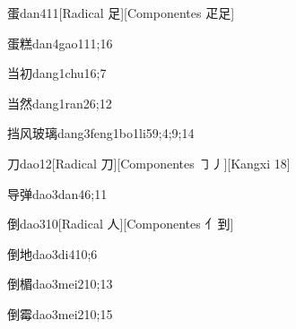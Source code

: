 \begin{verbete}{蛋}{dan4}{11}[Radical 足][Componentes ⽦足]
\end{verbete}

\begin{verbete}{蛋糕}{dan4gao1}{11;16}
\end{verbete}

\begin{verbete}{当初}{dang1chu1}{6;7}
\end{verbete}

\begin{verbete}{当然}{dang1ran2}{6;12}
\end{verbete}

\begin{verbete}{挡风玻璃}{dang3feng1bo1li5}{9;4;9;14}
\end{verbete}

\begin{verbete}{刀}{dao1}{2}[Radical ⼑][Componentes ㇆丿][Kangxi 18]
\end{verbete}

\begin{verbete}{导弹}{dao3dan4}{6;11}
\end{verbete}

\begin{verbete}{倒}{dao3}{10}[Radical 人][Componentes ⺅到]
\end{verbete}

\begin{verbete}{倒地}{dao3di4}{10;6}
\end{verbete}

\begin{verbete}{倒楣}{dao3mei2}{10;13}
\end{verbete}

\begin{verbete}{倒霉}{dao3mei2}{10;15}
\end{verbete}

